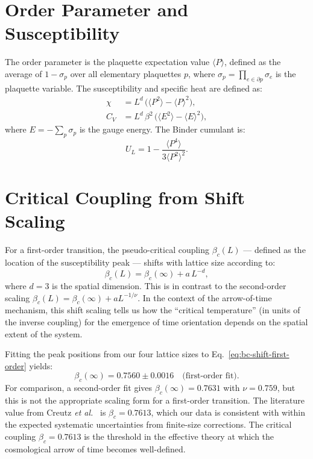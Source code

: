 \documentclass{article}
\newcommand{\etal}{\emph{et al.}}
\begin{document}
\section{Order Parameter and Susceptibility}

The order parameter is the plaquette expectation value $\langle P \rangle$, defined as the average of $1 - \sigma_p$ over all elementary plaquettes $p$, where $\sigma_p = \prod_{e \in \partial p} \sigma_e$ is the plaquette variable. The susceptibility and specific heat are defined as:
%
\begin{align}
\chi &= L^d \, \bigl(\langle P^2 \rangle - \langle P \rangle^2\bigr), \\
C_V &= L^d \, \beta^2 \, \bigl(\langle E^2 \rangle - \langle E \rangle^2\bigr),
\end{align}
%
where $E = -\sum_p \sigma_p$ is the gauge energy. The Binder cumulant is:
%
\begin{equation}
U_L = 1 - \frac{\langle P^4 \rangle}{3 \langle P^2 \rangle^2}.
\end{equation}

\section{Critical Coupling from Shift Scaling}

For a first-order transition, the pseudo-critical coupling $\beta_c(L)$ --- defined as the location of the susceptibility peak --- shifts with lattice size according to:
%
\begin{equation}
\beta_c(L) = \beta_c(\infty) + a \, L^{-d},
\label{eq:bc-shift-first-order}
\end{equation}
%
where $d=3$ is the spatial dimension. This is in contrast to the second-order scaling $\beta_c(L) = \beta_c(\infty) + a L^{-1/\nu}$. In the context of the arrow-of-time mechanism, this shift scaling tells us how the ``critical temperature'' (in units of the inverse coupling) for the emergence of time orientation depends on the spatial extent of the system.

Fitting the peak positions from our four lattice sizes to Eq.~\eqref{eq:bc-shift-first-order} yields:
%
\begin{equation}
\beta_c(\infty) = 0.7560 \pm 0.0016 \quad \text{(first-order fit)}.
\end{equation}
%
For comparison, a second-order fit gives $\beta_c(\infty) = 0.7631$ with $\nu = 0.759$, but this is not the appropriate scaling form for a first-order transition. The literature value from Creutz \etal~\cite{Creutz:1979zg} is $\beta_c = 0.7613$, which our data is consistent with within the expected systematic uncertainties from finite-size corrections. The critical coupling $\beta_c = 0.7613$ is the threshold in the effective theory at which the cosmological arrow of time becomes well-defined.
\end{document}

